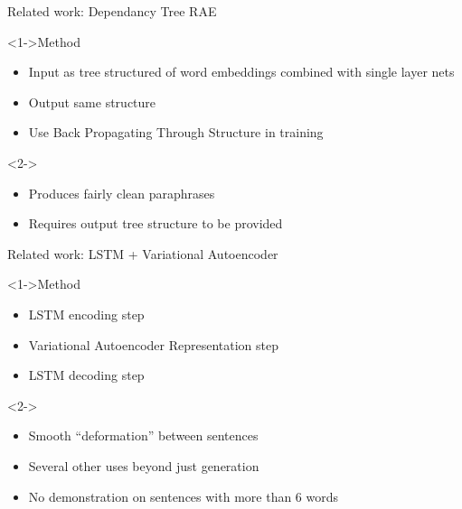 \documentclass[]{beamer}
\begin{document}


\begin{frame}{Related work: Dependancy Tree RAE}
	\begin{block}<1->{Method}
		\begin{itemize}
			\item Input as tree structured of word embeddings combined with single layer nets
			\item Output same structure
			\item Use Back Propagating Through Structure in training
		\end{itemize}
	\end{block}
	\begin{block}<2->{}
		\begin{itemize}
			\item Produces fairly clean paraphrases 
			\item Requires output tree structure to be provided
		\end{itemize}
	\end{block}
\end{frame}



\begin{frame}{Related work: LSTM + Variational Autoencoder}
	\begin{block}<1->{Method}
			\begin{itemize}
				\item LSTM encoding step
				\item Variational Autoencoder Representation step
				\item LSTM decoding step
			\end{itemize}
	\end{block}
	\begin{block}<2->{}
		\begin{itemize}
			\item Smooth ``deformation'' between sentences
			\item Several other uses beyond just generation
			\item No demonstration on sentences with more than 6 words
		\end{itemize}
	\end{block}
\end{frame}

\end{document}

